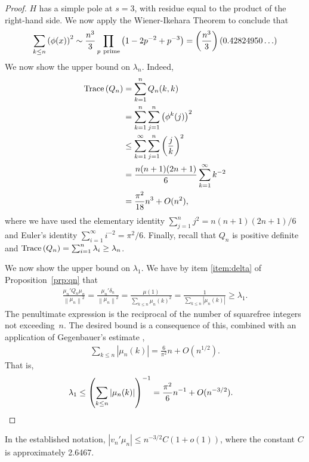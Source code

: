 \documentclass[12pt,reqno]{article}
\newcommand{\abs}[1]{\ensuremath{\left|{#1}\right|}}
\newcommand{\paren}[1]{\left\lparen{#1}\right\rparen}
\newcommand{\norm}[1]{\ensuremath{\left\|{#1}\right\|}}
\begin{document}
\begin{proof}
$H$ has a simple pole at $s=3$, with residue equal to the product of the right-hand side.
We now apply the Wiener-Ikehara Theorem to conclude that
\begin{align*}
\sum_{k\leq n}\paren{\phi(x)}^2 \sim \frac{n^3}{3} \prod_{p\ \textrm{prime}}  \paren{1 - 2p^{-2}+p^{-3}}=\paren{\frac{n^3}{3}}\paren{ 0.42824950\ldots}
\end{align*}
We now show the upper bound on $\lambda_n$. Indeed,
\begin{align*}
\operatorname{Trace}\paren{Q_n} &= \sum_{k=1}^{n}Q_n(k,k) \\
&= \sum_{k=1}^{n}\sum_{j=1}^{n} \paren{\phi^{k}(j)}^2 \\
&\leq \sum_{k=1}^{\infty}\sum_{j=1}^{n}\paren{\frac{j}{k}}^2 \\
&= \frac{n(n+1)(2n+1)}{6} \sum_{k=1}^{\infty} k^{-2} \\
&= \frac{\pi^2}{18}n^3 + O(n^{2}),
\end{align*}
where we have used the elementary identity $\sum_{j=1}^n j^2=n(n+1)(2n+1)/{6}$ and Euler's identity $\sum_{i=1}^{\infty}{i^{-2}}=\pi^2/6$.
Finally, recall that $Q_n$ is positive definite and $\operatorname{Trace}\paren{Q_n} =\sum_{i=1}^{n}\lambda_i\geq \lambda_n$.

We now show the upper bound on $\lambda_1$. We have by item \ref{item:delta} of Proposition~\ref{prp:qn} that
\begin{align*}
\frac{\mu_n'Q_n\mu_n}{\norm{\mu_n}^2} = \frac{\mu_n'\delta_n}{\norm{\mu_n}^2} = \frac{\mu(1)}{\sum_{k\leq n}\mu_n(k)^2}
=
\frac{1}{\sum_{k\leq n}\abs{\mu_n(k)}}\geq \lambda_1.
\end{align*}
The penultimate expression is the reciprocal of the number of squarefree integers not exceeding~$n$. The desired bound is a consequence of this,
combined with an application of Gegenbauer's estimate \cite[p.\ 47]{gegenbauer1885},
\begin{align*}
{\sum_{k\leq n}\abs{\mu_n(k)}}=\frac{6}{\pi^2} n + O(n^{1/2}). 
\end{align*}
That is,
\begin{align*}
\lambda_1 &\leq \paren{\sum_{k\leq n}\abs{\mu_n(k)}}^{-1}={\frac{\pi^2}{6}n^{-1} + O(n^{-3/2})}.\qedhere
\end{align*}
\end{proof}
\begin{corollary}
In the established notation,
$\abs{v_n'\mu_n} \leq n^{-3/2} C(1+o(1))$,
\label{cor:mun}
where the constant $C$ is approximately 2.6467.
\end{corollary}
\end{document}

